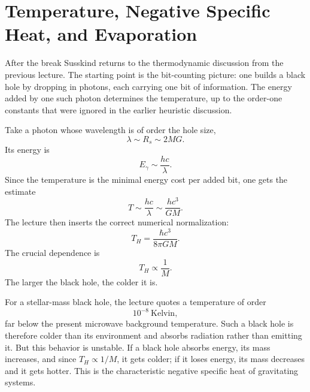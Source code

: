 \section{Temperature, Negative Specific Heat, and Evaporation}

After the break Susskind returns to the thermodynamic discussion from the previous lecture. The starting point is the bit-counting picture: one builds a black hole by dropping in photons, each carrying one bit of information. The energy added by one such photon determines the temperature, up to the order-one constants that were ignored in the earlier heuristic discussion.

Take a photon whose wavelength is of order the hole size,
\begin{equation}
\lambda \sim R_s \sim 2MG.
\end{equation}
Its energy is
\begin{equation}
E_\gamma \sim \frac{hc}{\lambda}.
\end{equation}
Since the temperature is the minimal energy cost per added bit, one gets the estimate
\begin{equation}
T \sim \frac{hc}{\lambda} \sim \frac{hc^3}{GM}.
\end{equation}
The lecture then inserts the correct numerical normalization:
\begin{equation}
T_H = \frac{\hbar c^3}{8\pi GM}.
\end{equation}
The crucial dependence is
\begin{equation}
T_H \propto \frac{1}{M}.
\end{equation}
The larger the black hole, the colder it is.

For a stellar-mass black hole, the lecture quotes a temperature of order
\[
10^{-8}\ \text{Kelvin},
\]
far below the present microwave background temperature. Such a black hole is therefore colder than its environment and absorbs radiation rather than emitting it. But this behavior is unstable. If a black hole absorbs energy, its mass increases, and since \(T_H \propto 1/M\), it gets colder; if it loses energy, its mass decreases and it gets hotter. This is the characteristic negative specific heat of gravitating systems.

